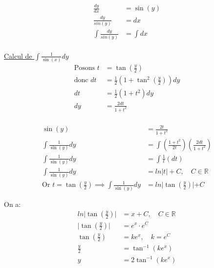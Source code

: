 \begin{align*}
	\frac{dy}{dx} &= \sin(y) \\
	\frac{dy}{sin(y)} &= dx \\
	\int \frac {dy}{sin(y)} &= \int dx \\
\end{align*}

\underline{Calcul de $\int \frac{1}{\sin(x)} dy$} \\
\begin{align*}
\text{Posons } t &= \tan(\frac{y}{2}) \\
\text{donc } dt &= \frac{1}{2}(1 + \tan^2(\frac{y}{2}))dy \\
dt &= \frac{1}{2}(1 + t^2)dy \\ dy &= \frac{2dt}{1+t^2} \\	
\end{align*}


\begin{align*}
	\sin(y) &= \frac{2t}{1 + t^2} \\
	\int \frac{1}{\sin(y)} dy &= \int (\frac{1+t^2}{2t}) (\frac{2dt}{1+t^2}) \\
	\int \frac{1}{\sin(y)} dy &= \int \frac{1}{t} ({dt}) \\
	\int \frac{1}{\sin(y)} dy &= ln|t| + C, \quad C \in \mathbb{R} \\
	\text{Or } t = \tan(\frac{y}{2}) \implies \int \frac{1}{\sin(y)} dy &= ln \lvert \tan(\frac{y}{2}) \lvert + C
\end{align*}

On a: \\
\begin{align*}
	ln \lvert \tan(\frac{y}{2}) \lvert &= x + C, \quad C \in \mathbb{R} \\
	\lvert \tan(\frac{y}{2}) \lvert &= e^x \cdot e^C \\
	\tan(\frac{y}{2}) &= ke^x, \quad k = e^C\\
	 \frac{y}{2} &= \tan^{-1} (ke^x) \\
	 y &= 2 \tan^{-1} (ke^x) \\
\end{align*}
